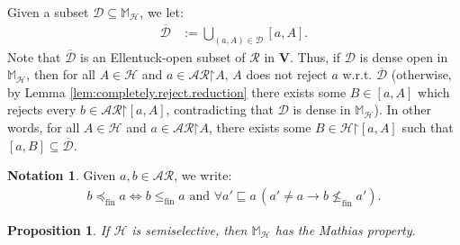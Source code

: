 \documentclass[10pt,a4paper]{amsart}
\theoremstyle{plain}
\numberwithin{equation}{section}
\newtheorem{proposition}[theorem]{Proposition}
\theoremstyle{definition}
\newtheorem{notation}[theorem]{Notation}
\renewcommand{\bar}[1]{\overline{#1}}
\newcommand{\cal}{\mathcal}
\renewcommand{\bf}{\mathbf}
\newcommand{\restrictedto}{\mathord{\upharpoonright}}
\newcommand{\V}{\bf{V}}
\renewcommand{\H}{\cal{H}}
\newcommand{\fin}{\mathrm{fin}}
\newcommand{\D}{\cal{D}}
\begin{document}
Given a subset $\D \subseteq \mathbb{M}_\H$, we let:
\begin{align*}
    \bar{\D} &:= \bigcup_{(a,A) \in \D} [a,A].
\end{align*}
Note that $\bar{\D}$ is an Ellentuck-open subset of $\cal{R}$ in $\V$. Thus, if $\D$ is dense open in $\mathbb{M}_\H$, then for all $A \in \H$ and $a \in \cal{AR}\restrictedto A$, $A$ does not reject $a$ w.r.t. $\bar{\D}$ (otherwise, by Lemma \ref{lem:completely.reject.reduction} there exists some $B \in [a,A]$ which rejects every $b \in \cal{AR}\restrictedto[a,A]$, contradicting that $\D$ is dense in $\mathbb{M}_\H$). In other words, for all $A \in \H$ and $a \in \cal{AR}\restrictedto A$, there exists some $B \in \H\restrictedto[a,A]$ such that $[a,B] \subseteq \bar{\D}$.

\begin{notation}
    Given $a,b \in \cal{AR}$, we write:
    \begin{align*}
        b \preceq_\fin a \iff b \leq_\fin a \text{ and } \forall a' \sqsubseteq a \,(a' \neq a \to b \not\leq_\fin a').
    \end{align*}
\end{notation}

\begin{proposition}
\label{prop:semiselective.implies.Mathias}
    If $\H$ is semiselective, then $\mathbb{M}_\H$ has the Mathias property.
\end{proposition}
\end{document}

